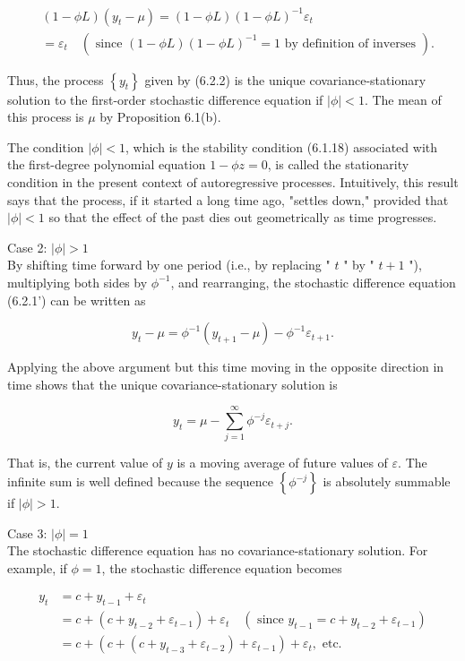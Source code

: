 \documentclass[10pt]{article}
\begin{document}
$$
\begin{aligned}
& (1-\phi L)\left(y_{t}-\mu\right)=(1-\phi L)(1-\phi L)^{-1} \varepsilon_{t} \\
& =\varepsilon_{t} \quad\left(\text { since }(1-\phi L)(1-\phi L)^{-1}=1 \text { by definition of inverses }\right) .
\end{aligned}
$$

Thus, the process $\left\{y_{t}\right\}$ given by (6.2.2) is the unique covariance-stationary solution to the first-order stochastic difference equation if $|\phi|<1$. The mean of this process is $\mu$ by Proposition 6.1(b).

The condition $|\phi|<1$, which is the stability condition (6.1.18) associated with the first-degree polynomial equation $1-\phi z=0$, is called the stationarity condition in the present context of autoregressive processes. Intuitively, this result says that the process, if it started a long time ago, "settles down," provided that $|\phi|<1$ so that the effect of the past dies out geometrically as time progresses.

Case 2: $|\phi|>1$\\
By shifting time forward by one period (i.e., by replacing " $t$ " by " $t+1$ "), multiplying both sides by $\phi^{-1}$, and rearranging, the stochastic difference equation (6.2.1') can be written as


\begin{equation*}
y_{t}-\mu=\phi^{-1}\left(y_{t+1}-\mu\right)-\phi^{-1} \varepsilon_{t+1} . \tag{6.2.3}
\end{equation*}


Applying the above argument but this time moving in the opposite direction in time shows that the unique covariance-stationary solution is


\begin{equation*}
y_{t}=\mu-\sum_{j=1}^{\infty} \phi^{-j} \varepsilon_{t+j} . \tag{6.2.4}
\end{equation*}


That is, the current value of $y$ is a moving average of future values of $\varepsilon$. The infinite sum is well defined because the sequence $\left\{\phi^{-j}\right\}$ is absolutely summable if $|\phi|>1$.

Case 3: $|\phi|=1$\\
The stochastic difference equation has no covariance-stationary solution. For example, if $\phi=1$, the stochastic difference equation becomes

$$
\begin{aligned}
y_{t} & =c+y_{t-1}+\varepsilon_{t} \\
& =c+\left(c+y_{t-2}+\varepsilon_{t-1}\right)+\varepsilon_{t} \quad\left(\text { since } y_{t-1}=c+y_{t-2}+\varepsilon_{t-1}\right) \\
& =c+\left(c+\left(c+y_{t-3}+\varepsilon_{t-2}\right)+\varepsilon_{t-1}\right)+\varepsilon_{t}, \text { etc. }
\end{aligned}
$$
\end{document}
